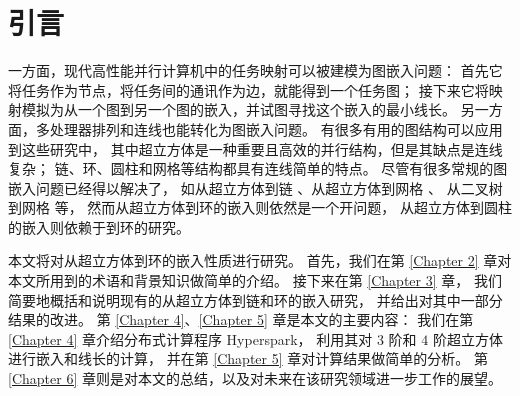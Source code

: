 
\chapter{引言}
\label{Chapter 1}

一方面，现代高性能并行计算机中的任务映射可以被建模为图嵌入问题：
首先它将任务作为节点，将任务间的通讯作为边，就能得到一个任务图；
接下来它将映射模拟为从一个图到另一个图的嵌入，并试图寻找这个嵌入的最小线长。
另一方面，多处理器排列和连线也能转化为图嵌入问题。
有很多有用的图结构可以应用到这些研究中，
其中超立方体是一种重要且高效的并行结构，但是其缺点是连线复杂；
链、环、圆柱和网格等结构都具有连线简单的特点。
尽管有很多常规的图嵌入问题已经得以解决了，
如从超立方体到链 \cite{Harper.1964}、从超立方体到网格 \cite{Manuel.2009}、
从二叉树到网格 \cite{Opatrny.2000} 等，
然而从超立方体到环的嵌入则依然是一个开问题，
从超立方体到圆柱的嵌入则依赖于到环的研究。

本文将对从超立方体到环的嵌入性质进行研究。
首先，我们在第 \ref{Chapter 2} 章对本文所用到的术语和背景知识做简单的介绍。
接下来在第 \ref{Chapter 3} 章，
我们简要地概括和说明现有的从超立方体到链和环的嵌入研究，
并给出对其中一部分结果的改进。
第 \ref{Chapter 4}、\ref{Chapter 5} 章是本文的主要内容：
我们在第 \ref{Chapter 4} 章介绍分布式计算程序 Hyperspark，
利用其对 $3$ 阶和 $4$ 阶超立方体进行嵌入和线长的计算，
并在第 \ref{Chapter 5} 章对计算结果做简单的分析。
第 \ref{Chapter 6} 章则是对本文的总结，以及对未来在该研究领域进一步工作的展望。
